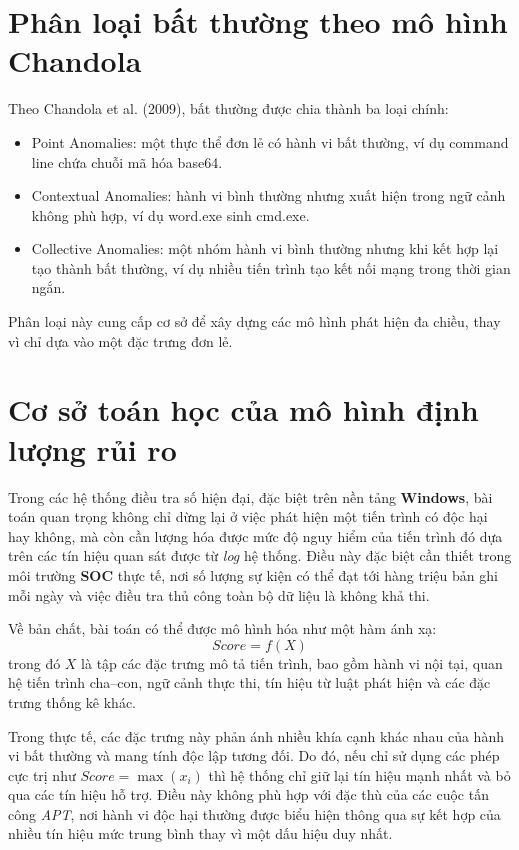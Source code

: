 \documentclass[../main.tex]{subfiles}
\begin{document}
\section{Phân loại bất thường theo mô hình Chandola}
\label{subsection:2.3}
Theo Chandola et al. (2009), bất thường được chia thành ba loại chính:

\begin{itemize}
    \item Point Anomalies: một thực thể đơn lẻ có hành vi bất thường, ví dụ command line chứa chuỗi mã hóa base64.
    \item Contextual Anomalies: hành vi bình thường nhưng xuất hiện trong ngữ cảnh không phù hợp, ví dụ word.exe sinh cmd.exe.
    \item Collective Anomalies: một nhóm hành vi bình thường nhưng khi kết hợp lại tạo thành bất thường, ví dụ nhiều tiến trình tạo kết nối mạng trong thời gian ngắn.
\end{itemize}

Phân loại này cung cấp cơ sở để xây dựng các mô hình phát hiện đa chiều, thay vì chỉ dựa vào một đặc trưng đơn lẻ.


\section{Cơ sở toán học của mô hình định lượng rủi ro}
\label{section:2.6}
Trong các hệ thống điều tra số hiện đại, đặc biệt trên nền tảng \textbf{Windows}, bài toán quan trọng không chỉ dừng lại ở việc phát hiện một tiến trình có độc hại hay không, mà còn cần lượng hóa được mức độ nguy hiểm của tiến trình đó dựa trên các tín hiệu quan sát được từ \textit{log} hệ thống. Điều này đặc biệt cần thiết trong môi trường \textbf{SOC} thực tế, nơi số lượng sự kiện có thể đạt tới hàng triệu bản ghi mỗi ngày và việc điều tra thủ công toàn bộ dữ liệu là không khả thi.

Về bản chất, bài toán có thể được mô hình hóa như một hàm ánh xạ:
\begin{equation}
    Score = f(X) \tag{1.2}
\end{equation}
trong đó $X$ là tập các đặc trưng mô tả tiến trình, bao gồm hành vi nội tại, quan hệ tiến trình cha–con, ngữ cảnh thực thi, tín hiệu từ luật phát hiện và các đặc trưng thống kê khác.

Trong thực tế, các đặc trưng này phản ánh nhiều khía cạnh khác nhau của hành vi bất thường và mang tính độc lập tương đối. Do đó, nếu chỉ sử dụng các phép cực trị như $Score = \max(x_i)$ thì hệ thống chỉ giữ lại tín hiệu mạnh nhất và bỏ qua các tín hiệu hỗ trợ. Điều này không phù hợp với đặc thù của các cuộc tấn công \textit{APT}, nơi hành vi độc hại thường được biểu hiện thông qua sự kết hợp của nhiều tín hiệu mức trung bình thay vì một dấu hiệu duy nhất.
\end{document}
